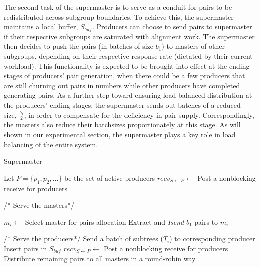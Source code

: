 \documentclass[10pt,journal,letterpaper,compsoc]{IEEEtran}
\begin{document}
The second task of the supermaster is to serve as a conduit for pairs to be redistributed across subgroup boundaries. To achieve this, the supermaster maintains a local buffer, $S_{buf}$. Producers can choose to send pairs to supermaster if their respective subgroups are saturated with alignment work. The supermaster then decides to push the pairs (in batches of size $b_1$) to masters of other subgroups, depending on their respective response rate (dictated by their current workload). This functionality is expected to be brought into effect at the ending stages of producers' pair generation, when there could be a few producers that are still churning out pairs in numbers while other producers have completed generating pairs. As a further step toward ensuring load balanced distribution at the producers' ending stages, the supermaster sends out batches of a reduced size, $\frac{b_1}{2}$, in order to compensate for the deficiency in pair supply. Correspondingly, the masters also reduce their batchsizes proportionately at this stage. As will shown in our experimental section, the supermaster plays a key role in load balancing of the entire system.



\begin{algorithm}
\caption{Supermaster}
\label{sp}
\begin{algorithmic}[1]
	\STATE Let $P=\{p_1, p_2, ...\}$ be the set of active producers
	\STATE $recv_{S\leftarrow P}\leftarrow$ Post a nonblocking receive for producers
			
	    
	    \STATE /* Serve the masters*/        
	    	
	    	\STATE $m_i\leftarrow$ Select master for pairs allocation
		    \STATE Extract and {\it Isend} $b_1$ pairs to $m_i$ 
		    	
		    \ENDIF
		    \STATE /* Serve the producers*/        
		             \STATE Send a batch of subtrees ($T_i$) to corresponding producer
			        \STATE Insert pairs in $S_{buf}$
		        \ENDIF
		        \STATE $recv_{S\leftarrow P}\leftarrow$ Post a nonblocking receive for producers
		    \ENDIF    
    \ENDWHILE
	\STATE Distribute remaining pairs to all masters in a round-robin way
\end{algorithmic}
\end{algorithm}
\end{document}
